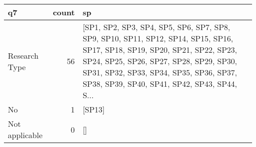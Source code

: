 \begin{tabular}{lrl}
\toprule
             q7 &  count &                                                                                                                                                                                                                                                              sp \\
\midrule
  Research Type &     56 &  [SP1, SP2, SP3, SP4, SP5, SP6, SP7, SP8, SP9, SP10, SP11, SP12, SP14, SP15, SP16, SP17, SP18, SP19, SP20, SP21, SP22, SP23, SP24, SP25, SP26, SP27, SP28, SP29, SP30, SP31, SP32, SP33, SP34, SP35, SP36, SP37, SP38, SP39, SP40, SP41, SP42, SP43, SP44, S... \\
             No &      1 &                                                                                                                                                                                                                                                          [SP13] \\
 Not applicable &      0 &                                                                                                                                                                                                                                                              [] \\
\bottomrule
\end{tabular}
